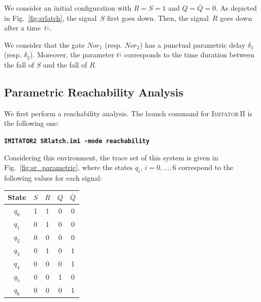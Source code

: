 \documentclass[a4paper,10pt]{article}
\newcommand{\imitatordeux}{\textsc{Imitator}\,II}
\newcommand{\imitatordeuxExec}{\code{IMITATOR2}}
\newcommand{\code}[1]{\textbf{\texttt{#1}}}
\begin{document}
We consider an initial configuration with $R = S = 1$ and $Q = \overline{Q} = 0$.
As depicted in Fig.~\ref{fig:srlatch}, the signal~$S$ first goes down.
Then, the signal~$R$ goes down after a time~$t^\downarrow$.


We consider that the gate $\mathit{Nor}_1$ (resp. $\mathit{Nor}_2$) has a punctual parametric delay $\delta_1$ (resp. $\delta_2$).
Moreover, the parameter $t^\downarrow$ corresponds to the time duration between the fall of $S$ and the fall of $R$.


\subsection{Parametric Reachability Analysis}

We first perform a reachability analysis.
The launch command for \imitatordeux{} is the following one:

\code{\imitatordeuxExec{} SRlatch.imi -mode reachability}

Considering this environment, the trace set of this system is given in Fig.~\ref{fig:sr_parametric}, where the states $q_i$, $i = 0, \dots, 6$ correspond to the following values for each signal:

\smallskip

{

\centering

\begin{tabular}{|c||c|c|c|c|}
	\hline
	State & $S$ & $R$ & $Q$ & $\overline{Q}$ \\
	\hline
	$q_0$ & 1 & 1 & 0 & 0 \\
	\hline
	$q_1$ & 0 & 1 & 0 & 0 \\
	\hline
	$q_2$ & 0 & 0 & 0 & 0 \\
	\hline
	$q_3$ & 0 & 1 & 0 & 1 \\
	\hline
	$q_4$ & 0 & 0 & 0 & 1 \\
	\hline
	$q_5$ & 0 & 0 & 1 & 0 \\
	\hline
	$q_6$ & 0 & 0 & 0 & 1 \\
	\hline
\end{tabular}

}

\medskip
\end{document}
